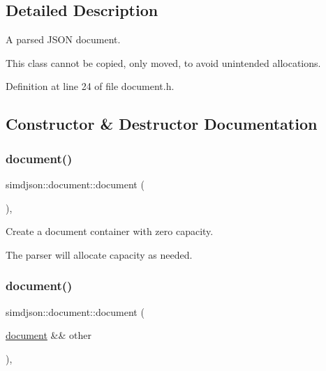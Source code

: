 \subsection{Detailed Description}
A parsed J\+S\+ON document. 

This class cannot be copied, only moved, to avoid unintended allocations. 

Definition at line 24 of file document.\+h.



\subsection{Constructor \& Destructor Documentation}
\mbox{\label{classsimdjson_1_1document_ae567f14c4585f81011584d08d5b97323}} 
\subsubsection{\texorpdfstring{document()}{document()}\hspace{0.1cm}{\footnotesize\ttfamily [1/2]}}
{\footnotesize\ttfamily simdjson\+::document\+::document (\begin{DoxyParamCaption}{ }\end{DoxyParamCaption})\hspace{0.3cm}{\ttfamily [default]}, {\ttfamily [noexcept]}}



Create a document container with zero capacity. 

The parser will allocate capacity as needed. \mbox{\label{classsimdjson_1_1document_a4f548bb085c9cd0b2467a6539d651699}} 
\subsubsection{\texorpdfstring{document()}{document()}\hspace{0.1cm}{\footnotesize\ttfamily [2/2]}}
{\footnotesize\ttfamily simdjson\+::document\+::document (\begin{DoxyParamCaption}\item[{\hyperlink{classsimdjson_1_1document}{document} \&\&}]{other }\end{DoxyParamCaption})\hspace{0.3cm}{\ttfamily [default]}, {\ttfamily [noexcept]}}



